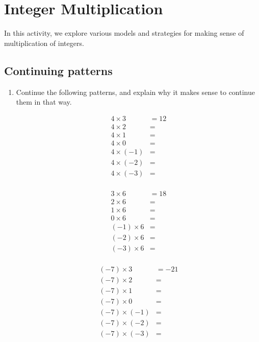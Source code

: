 \newpage
\section{Integer Multiplication}\label{A:integerMultiplication}



In this activity, we explore various models and strategies for 
making sense of multiplication of integers.  

\subsection*{Continuing patterns}
\begin{prob}
\begin{enumerate}
\item Continue the following patterns, and explain why it makes sense to continue them in that way.    

\begin{minipage}{0.45\textwidth}
\begin{align*}
4\times 3 &= 12 \\
4\times 2 &= \\
4\times 1 &= \\
4\times 0 &= \\
4\times (-1) &= \\
4\times (-2) &= \\
4\times (-3) &= \\
\end{align*}
\end{minipage}
\begin{minipage}{0.45\textwidth}
\begin{align*}
3\times 6 &= 18 \\
2\times 6 &= \\
1\times 6 &= \\
0\times 6 &= \\
(-1)\times 6 &= \\
(-2)\times 6 &= \\
(-3)\times 6 &= \\
\end{align*}
\end{minipage}
\begin{minipage}{0.45\textwidth}
\begin{align*}
(-7)\times 3 &= -21 \\
(-7)\times 2 &= \\
(-7)\times 1 &= \\
(-7)\times 0 &= \\
(-7)\times (-1) &= \\
(-7)\times (-2) &= \\
(-7)\times (-3) &= \\
\end{align*}
\end{minipage}


\end{enumerate}
\end{prob}
